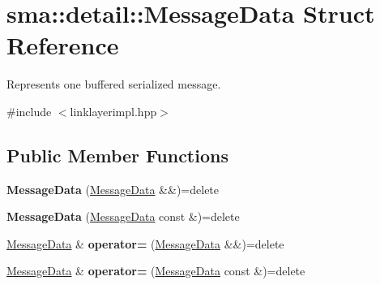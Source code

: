 \hypertarget{structsma_1_1detail_1_1MessageData}{\section{sma\-:\-:detail\-:\-:Message\-Data Struct Reference}
\label{structsma_1_1detail_1_1MessageData}
}


Represents one buffered serialized message.  




{\ttfamily \#include $<$linklayerimpl.\-hpp$>$}

\subsection*{Public Member Functions}
\begin{DoxyCompactItemize}
\item 
\hypertarget{structsma_1_1detail_1_1MessageData_a7003684bd71006bc579b40f179523af5}{{\bfseries Message\-Data} (\hyperlink{structsma_1_1detail_1_1MessageData}{Message\-Data} \&\&)=delete}\label{structsma_1_1detail_1_1MessageData_a7003684bd71006bc579b40f179523af5}

\item 
\hypertarget{structsma_1_1detail_1_1MessageData_acfaf2e1e04388a7a1bee38afe2fd60ce}{{\bfseries Message\-Data} (\hyperlink{structsma_1_1detail_1_1MessageData}{Message\-Data} const \&)=delete}\label{structsma_1_1detail_1_1MessageData_acfaf2e1e04388a7a1bee38afe2fd60ce}

\item 
\hypertarget{structsma_1_1detail_1_1MessageData_acd8dcc80646958508c6801231c8da4e2}{\hyperlink{structsma_1_1detail_1_1MessageData}{Message\-Data} \& {\bfseries operator=} (\hyperlink{structsma_1_1detail_1_1MessageData}{Message\-Data} \&\&)=delete}\label{structsma_1_1detail_1_1MessageData_acd8dcc80646958508c6801231c8da4e2}

\item 
\hypertarget{structsma_1_1detail_1_1MessageData_a234011c43f7b0556c809e1a759abf989}{\hyperlink{structsma_1_1detail_1_1MessageData}{Message\-Data} \& {\bfseries operator=} (\hyperlink{structsma_1_1detail_1_1MessageData}{Message\-Data} const \&)=delete}\label{structsma_1_1detail_1_1MessageData_a234011c43f7b0556c809e1a759abf989}

\end{DoxyCompactItemize}
